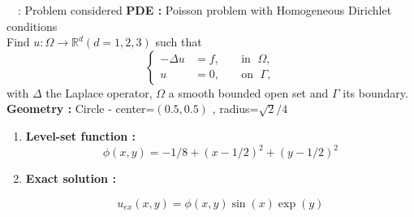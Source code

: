 \begin{frame}{\appendixname~\theappendixframenumber~: Problem considered}
	\textbf{PDE :} Poisson problem with Homogeneous Dirichlet conditions \\
	Find $u : \Omega \rightarrow \mathbb{R}^d (d=1,2,3)$ such that
	\begin{equation*}
		\left\{
		\begin{aligned}
			-\Delta u &= f, \; &&\text{in } \; \Omega, \\
			u&=0, \; &&\text{on } \; \Gamma,
		\end{aligned}
		\right.
	\end{equation*}
	with $\Delta$ the Laplace operator, $\Omega$ a smooth bounded open set and $\Gamma$ its boundary. \\
	
	\textbf{Geometry :} Circle - center=$(0.5,0.5)$ , radius=$\sqrt{2}/4$ \\
	\begin{minipage}{0.3\linewidth}
		\centering
	\end{minipage} \;
	\begin{minipage}{0.68\linewidth}
		\begin{enumerate}[\ding{217}]
			\item \textbf{Level-set function : }
			$$\phi(x,y)=-1/8+(x-1/2)^2+(y-1/2)^2$$
			
			\item \textbf{Exact solution :} 
			
			\begin{equation*}
				u_{ex}(x,y) = \phi(x,y)\sin(x)\exp(y)
			\end{equation*} 
		\end{enumerate}
	\end{minipage}
\end{frame}

